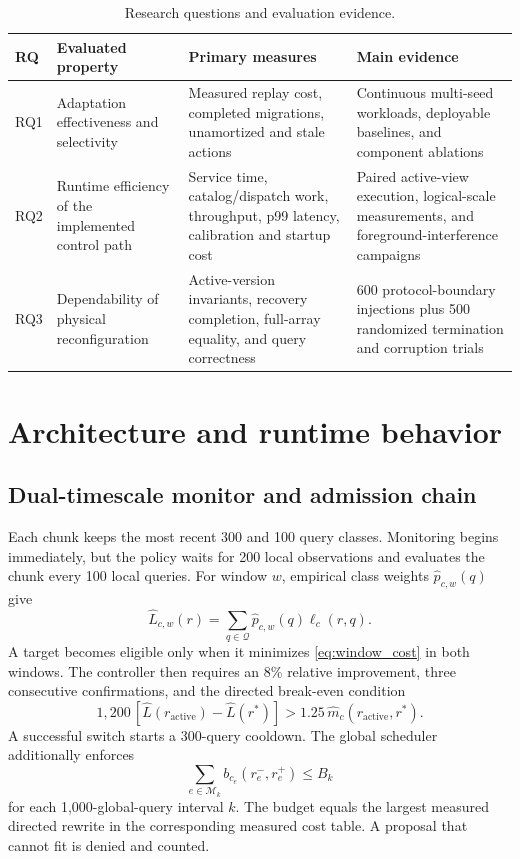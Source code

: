 \documentclass[final,5p,times,twocolumn,authoryear]{elsarticle}
\begin{document}
\begin{table}[t]
\centering
\caption{Research questions and evaluation evidence.}
\label{tab:rqs}
\footnotesize
\begin{tabularx}{\textwidth}{@{}p{}p{}p{}X@{}}
\toprule
RQ & Evaluated property & Primary measures & Main evidence \\
\midrule
RQ1 & Adaptation effectiveness and selectivity & Measured replay cost, completed migrations, unamortized and stale actions & Continuous multi-seed workloads, deployable baselines, and component ablations \\
RQ2 & Runtime efficiency of the implemented control path & Service time, catalog/dispatch work, throughput, p99 latency, calibration and startup cost & Paired active-view execution, logical-scale measurements, and foreground-interference campaigns \\
RQ3 & Dependability of physical reconfiguration & Active-version invariants, recovery completion, full-array equality, and query correctness & 600 protocol-boundary injections plus 500 randomized termination and corruption trials \\
\bottomrule
\end{tabularx}
\end{table}

\section{Architecture and runtime behavior}
\label{sec:architecture}

\subsection{Dual-timescale monitor and admission chain}

Each chunk keeps the most recent 300 and 100 query classes. Monitoring begins immediately, but the policy waits for 200 local observations and evaluates the chunk every 100 local queries. For window $w$, empirical class weights $\widehat{p}_{c,w}(q)$ give
\begin{equation}
\widehat{L}_{c,w}(r)=
\sum_{q\in\mathcal{Q}}\widehat{p}_{c,w}(q)\ell_c(r,q).
\label{eq:window_cost}
\end{equation}
A target becomes eligible only when it minimizes \cref{eq:window_cost} in both windows. The controller then requires an 8\% relative improvement, three consecutive confirmations, and the directed break-even condition
\begin{equation}
1{,}200\,[\widehat{L}(r_{\mathrm{active}})-\widehat{L}(r^*)]
>1.25\,\widehat{m}_c(r_{\mathrm{active}},r^*).
\label{eq:break_even}
\end{equation}
A successful switch starts a 300-query cooldown. The global scheduler additionally enforces
\begin{equation}
\sum_{e\in\mathcal{M}_k} b_{c_e}(r^-_e,r^+_e)\le B_k
\label{eq:budget}
\end{equation}
for each 1,000-global-query interval $k$. The budget equals the largest measured directed rewrite in the corresponding measured cost table. A proposal that cannot fit is denied and counted.
\end{document}
